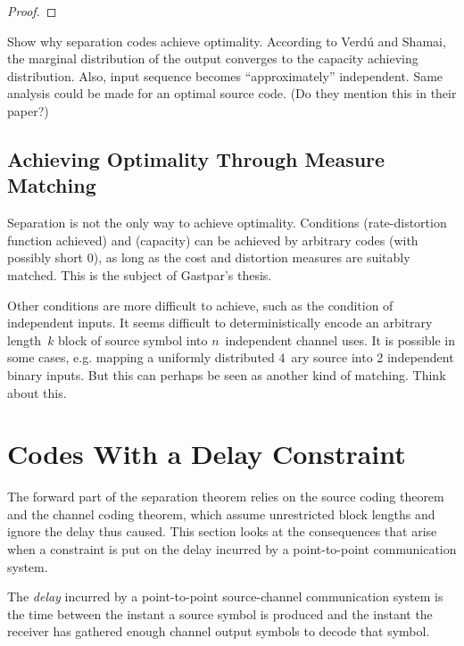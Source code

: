 \begin{proof}

\end{proof}



Show why separation codes achieve optimality. According to Verd\'u and Shamai,
the marginal distribution of the output converges to the capacity achieving
distribution. Also, input sequence becomes ``approximately'' independent. Same
analysis could be made for an optimal source code. (Do they mention this in
their paper?)


\subsection{Achieving Optimality Through Measure Matching}

Separation is not the only way to achieve optimality. Conditions
(rate-distortion function achieved) and (capacity) can be achieved by arbitrary
codes (with possibly short 0), as long as the cost and distortion
measures are suitably matched. This is the subject of Gastpar's thesis.

Other conditions are more difficult to achieve, such as the condition of
independent inputs. It seems difficult to deterministically encode an arbitrary
length~$k$ block of source symbol into $n$~independent channel uses. 
It is possible in some cases, e.g. mapping a uniformly distributed $4$~ary
source into 2 independent binary inputs. But this can perhaps be seen as another
kind of matching. Think about this.


\section{Codes With a Delay Constraint}

The forward part of the separation theorem relies on the source coding theorem
and the channel coding theorem, which assume unrestricted block lengths and
ignore the delay thus caused. This section looks at the consequences that arise
when a constraint is put on the delay incurred by a point-to-point communication
system.

\begin{definition}
  \label{def:delay}
  The \emph{delay} incurred by a point-to-point source-channel communication
  system is the time between the instant a source symbol is produced and the
  instant the receiver has gathered enough channel output symbols to decode that
  symbol. 
\end{definition}

